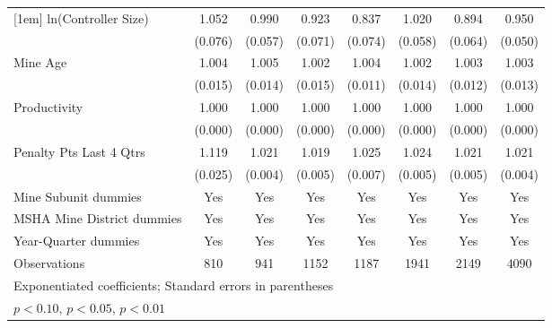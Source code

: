 {\begin{tabular}{l*{7}{c}}
[1em]
ln(Controller Size)      &       1.052         &       0.990         &       0.923         &       0.837\sym{**} &       1.020         &       0.894         &       0.950         \\
                         &     (0.076)         &     (0.057)         &     (0.071)         &     (0.074)         &     (0.058)         &     (0.064)         &     (0.050)         \\
[1em]
Mine Age                 &       1.004         &       1.005         &       1.002         &       1.004         &       1.002         &       1.003         &       1.003         \\
                         &     (0.015)         &     (0.014)         &     (0.015)         &     (0.011)         &     (0.014)         &     (0.012)         &     (0.013)         \\
[1em]
Productivity             &       1.000         &       1.000         &       1.000         &       1.000         &       1.000         &       1.000         &       1.000         \\
                         &     (0.000)         &     (0.000)         &     (0.000)         &     (0.000)         &     (0.000)         &     (0.000)         &     (0.000)         \\
[1em]
Penalty Pts Last 4 Qtrs  &       1.119\sym{***}&       1.021\sym{***}&       1.019\sym{***}&       1.025\sym{***}&       1.024\sym{***}&       1.021\sym{***}&       1.021\sym{***}\\
                         &     (0.025)         &     (0.004)         &     (0.005)         &     (0.007)         &     (0.005)         &     (0.005)         &     (0.004)         \\
[1em]
Mine Subunit dummies     &         Yes         &         Yes         &         Yes         &         Yes         &         Yes         &         Yes         &         Yes         \\
[1em]
MSHA Mine District dummies&         Yes         &         Yes         &         Yes         &         Yes         &         Yes         &         Yes         &         Yes         \\
[1em]
Year-Quarter dummies     &         Yes         &         Yes         &         Yes         &         Yes         &         Yes         &         Yes         &         Yes         \\
\hline
Observations             &         810         &         941         &        1152         &        1187         &        1941         &        2149         &        4090         \\
\hline\hline
\multicolumn{8}{l}{\footnotesize Exponentiated coefficients; Standard errors in parentheses}\\
\multicolumn{8}{l}{\footnotesize \sym{*} \(p<0.10\), \sym{**} \(p<0.05\), \sym{***} \(p<0.01\)}\\
\end{tabular}
}
